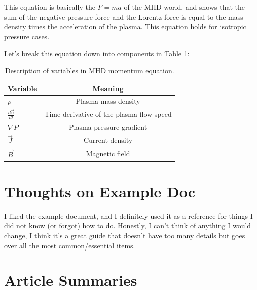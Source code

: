 \documentclass[12pt, letterpaper]{article}
\begin{document}
This equation is basically the $F=ma$ of the MHD world, and shows that the sum of the negative pressure force and the Lorentz force is equal to the mass density times the acceleration of the plasma. This equation holds for isotropic pressure cases.

Let's break this equation down into components in Table \ref{tab:1}:

\begin{table}[ht!]
  \centering
  \begin{tabular}{|l|c|}
    \hline
    Variable & Meaning\\
    \hline
    $\rho$ & Plasma mass density\\ 
    $\frac{d \vec{u}}{dt}$ & Time derivative of the plasma flow speed\\
    $\nabla P$ & Plasma pressure gradient\\
    $\vec{J}$ & Current density\\
    $\vec{B}$ & Magnetic field\\
    \hline
  \end{tabular}
  \caption{Description of variables in MHD momentum equation.}
  \label{tab:1}
\end{table}

\section{Thoughts on Example Doc}


I liked the example document, and I definitely used it as a reference for things I did not know (or forgot) how to do. Honestly, I can't think of anything I would change, I think it's a great guide that doesn't have too many details but goes over all the most common/essential items.

\section{Article Summaries}
\end{document}
